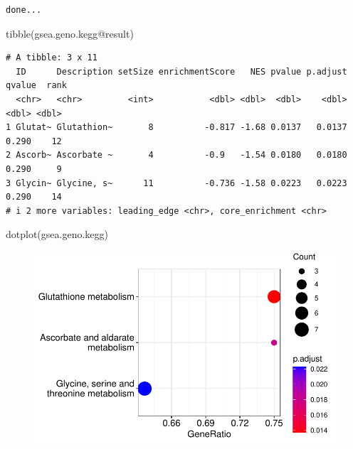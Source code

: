 \documentclass[
  24px,
  letterpaper,
  DIV=11,
  numbers=noendperiod]{scrartcl}
\newenvironment{Shaded}{\begin{snugshade}}{\end{snugshade}}
\newcommand{\FunctionTok}[1]{\textcolor[rgb]{0.28,0.35,0.67}{#1}}
\newcommand{\NormalTok}[1]{\textcolor[rgb]{0.00,0.23,0.31}{#1}}
\newcommand{\SpecialCharTok}[1]{\textcolor[rgb]{0.37,0.37,0.37}{#1}}
\begin{document}
\begin{verbatim}
done...
\end{verbatim}

\begin{Shaded}
\begin{Highlighting}[]
\FunctionTok{tibble}\NormalTok{(gsea.geno.kegg}\SpecialCharTok{@}\NormalTok{result)}
\end{Highlighting}
\end{Shaded}

\begin{verbatim}
# A tibble: 3 x 11
  ID      Description setSize enrichmentScore   NES pvalue p.adjust qvalue  rank
  <chr>   <chr>         <int>           <dbl> <dbl>  <dbl>    <dbl>  <dbl> <dbl>
1 Glutat~ Glutathion~       8          -0.817 -1.68 0.0137   0.0137  0.290    12
2 Ascorb~ Ascorbate ~       4          -0.9   -1.54 0.0180   0.0180  0.290     9
3 Glycin~ Glycine, s~      11          -0.736 -1.58 0.0223   0.0223  0.290    14
# i 2 more variables: leading_edge <chr>, core_enrichment <chr>
\end{verbatim}

\begin{Shaded}
\begin{Highlighting}[]
\FunctionTok{dotplot}\NormalTok{(gsea.geno.kegg)}
\end{Highlighting}
\end{Shaded}

\begin{figure}[H]

{\centering \includegraphics{index_files/figure-pdf/unnamed-chunk-45-1.pdf}

}

\end{figure}
\end{document}
